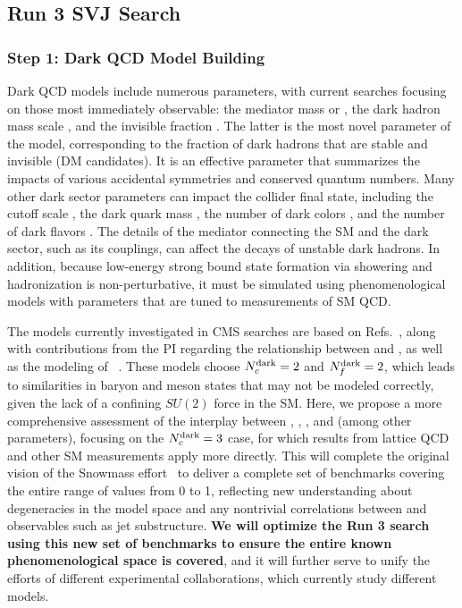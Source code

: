 \subsection{Run 3 SVJ Search}

\subsubsection{Step 1: Dark QCD Model Building}\label{subsec:models}

Dark QCD models include numerous parameters, with current searches focusing on those most immediately observable:
the mediator mass \mZprime or \mbifun, the dark hadron mass scale \mdark, and the invisible fraction \rinv.
The latter is the most novel parameter of the model, corresponding to the fraction of dark hadrons that are stable and invisible (DM candidates).
It is an effective parameter that summarizes the impacts of various accidental symmetries and conserved quantum numbers.
Many other dark sector parameters can impact the collider final state, including the cutoff scale \Lamdark, the dark quark mass \mqdark, the number of dark colors \Ncdark, and the number of dark flavors \Nfdark.
The details of the mediator connecting the SM and the dark sector, such as its couplings, can affect the decays of unstable dark hadrons.
In addition, because low-energy strong bound state formation via showering and hadronization is non-perturbative,
it must be simulated using phenomenological models with parameters that are tuned to measurements of SM QCD.

The models currently investigated in CMS searches are based on Refs.~\cite{Cohen:2015toa,Cohen:2017pzm}, along with contributions from the PI
regarding the relationship between \mdark and \Lamdark, as well as the modeling of \rinv~\cite{Albouy:2022cin}.
These models choose $N_{c}^{\text{dark}}=2$ and $N_{f}^{\text{dark}}=2$, which leads to similarities in baryon and meson states that may not be modeled correctly,
given the lack of a confining $SU(2)$ force in the SM.
Here, we propose a more comprehensive assessment of the interplay between \Nfdark, \Lamdark, \mdark, and \mqdark (among other parameters),
focusing on the $N_{c}^{\text{dark}}=3$ case, for which results from lattice QCD and other SM measurements apply more directly.
This will complete the original vision of the Snowmass effort~\cite{Albouy:2022cin}
to deliver a complete set of benchmarks covering the entire range of \rinv values from 0 to 1,
reflecting new understanding about degeneracies in the model space and any nontrivial correlations between \rinv and observables such as jet substructure.
\textbf{We will optimize the Run 3 search using this new set of benchmarks to ensure the entire known phenomenological space is covered},
and it will further serve to unify the efforts of different experimental collaborations, which currently study different models.

